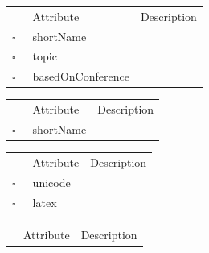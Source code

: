\begin{table}
\caption{SpecialIssue  }

\begin{longtable}{llp{8cm}}
& Attribute & Description \\
$\square$\ & shortName &  \\
$\square$\ & topic &  \\
$\square$\ & basedOnConference &  \\
\end{longtable}
\label{attr:SpecialIssue}
\end{table}

\begin{table}
\caption{Track  }

\begin{longtable}{llp{8cm}}
& Attribute & Description \\
$\square$\ & shortName &  \\
\end{longtable}
\label{attr:Track}
\end{table}

\clearpage
\begin{table}
\caption{Translator  }

\begin{longtable}{llp{8cm}}
& Attribute & Description \\
$\square$\ & unicode &  \\
$\square$\ & latex &  \\
\end{longtable}
\label{attr:Translator}
\end{table}

\begin{table}
\caption{UncategorizedReference  }

\begin{longtable}{llp{8cm}}
& Attribute & Description \\
\end{longtable}
\label{attr:UncategorizedReference}
\end{table}

